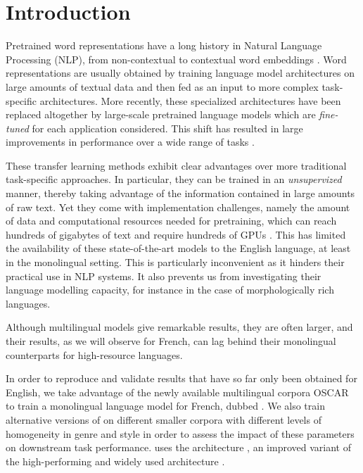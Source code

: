 
\section{Introduction}

Pretrained word representations have a long history in Natural Language Processing (NLP), from non-contextual \citep{brown-etal-1992-class,ando-zhang-2005-framework,mikolov-etal-2013-distributed,pennington-etal-2014-glove} to contextual word embeddings \citep{peters-etal-2018-deep,akbik-etal-2018-contextual}. Word representations are usually obtained by training language model architectures on large amounts of textual data and then fed as an input to more complex task-specific architectures. More recently, these specialized architectures have been replaced altogether by large-scale pretrained language models which are \emph{fine-tuned} for each application considered. This shift has resulted in large improvements in performance over a wide range of tasks \cite{devlin-etal-2019-bert,radford-etal-2019-language,liu-etal-2019-roberta,raffel-etal-2020-exploring}.

These transfer learning methods exhibit clear advantages over more traditional task-specific approaches. In particular, they can be trained in an \emph{unsupervized} manner, thereby taking advantage of the information contained in large amounts of raw text.
Yet they come with implementation challenges, namely the amount of data and computational resources needed for pretraining, which can reach hundreds of gigabytes of text and require hundreds of GPUs \citep{yang-etal-2019-xlnet,liu-etal-2019-roberta}. This has limited the availability of these state-of-the-art models to the English language, at least in the monolingual setting. This is particularly inconvenient as it hinders their practical use in NLP systems. It also prevents us from investigating their language modelling capacity, for instance in the case of morphologically rich languages.

Although multilingual models give remarkable results, they are often larger, and their results, as we will observe for French, can lag behind their monolingual counterparts for high-resource languages. %

In order to reproduce and validate results that have so far only been obtained for English, we take advantage of the newly available multilingual corpora OSCAR \cite{ortiz-suarez-etal-2019-asynchronous} to train a monolingual language model for French, dubbed \camembert. We also train alternative versions of \camembert on different smaller corpora with different levels of homogeneity in genre and style in order to assess the impact of these parameters on downstream task performance.
\camembert uses the \roberta architecture \cite{liu-etal-2019-roberta}, an improved variant of the high-performing and widely used \bert architecture \cite{devlin-etal-2019-bert}.

